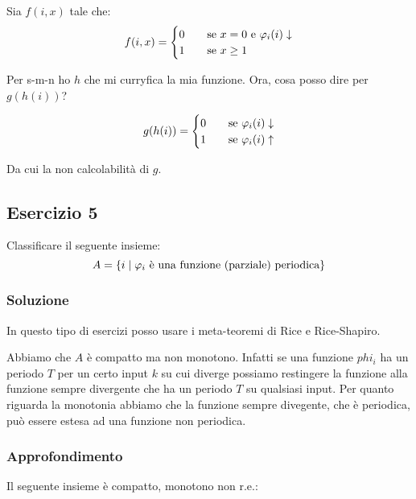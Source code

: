 Sia $f(i,x)$ tale che:
\begin{equation*}
    f(i,x) =
    \begin{cases}
        0 \quad &\text{se $x = 0$ e $\varphi_{i}(i) \downarrow$}\\
        1 \quad &\text{se $x \geq 1$}
    \end{cases}
\end{equation*}

Per s-m-n ho $h$ che mi curryfica la mia funzione. Ora, cosa posso dire per $g(h(i))$?

\begin{equation*}
    g(h(i)) =
    \begin{cases}
        0 \quad &\text{se $\varphi_{i}(i) \downarrow$}\\
        1 \quad &\text{se $\varphi_{i}(i) \uparrow$}\\
    \end{cases}
\end{equation*}

Da cui la non calcolabilità di $g$.

\subsection{Esercizio 5}

Classificare il seguente insieme:
\begin{equation*}
    A = \{i \mid \text{$\varphi_{i}$ è una funzione (parziale) periodica}\}
\end{equation*}

\subsubsection{Soluzione}

In questo tipo di esercizi posso usare i meta-teoremi di Rice e Rice-Shapiro.

Abbiamo che $A$ è compatto ma non monotono. Infatti se una funzione $phi_{i}$ ha un periodo $T$ per
un certo input $k$ su cui diverge possiamo restingere la funzione alla funzione sempre divergente
che ha un periodo $T$ su qualsiasi input. Per quanto riguarda la monotonia abbiamo che la funzione
sempre divegente, che è periodica, può essere estesa ad una funzione non periodica.

\subsubsection{Approfondimento}

Il seguente insieme è compatto, monotono non r.e.:

